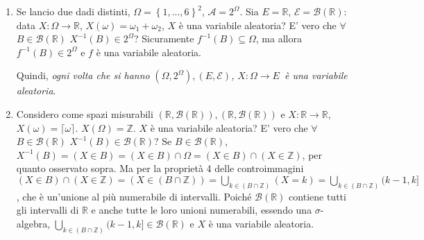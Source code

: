 \documentclass{article}
\begin{document}
\begin{enumerate}
\item Se lancio due dadi distinti, $\Omega =\left\{ 1,...,6\right\} ^{2}$, $%
\mathcal{A}=2^{\Omega }$. Sia $E=%
\mathbb{R}
$, $\mathcal{E=B}\left( 
\mathbb{R}
\right) $: data $X:\Omega \rightarrow 
\mathbb{R}
$, $X\left( \omega \right) =\omega _{1}+\omega _{2}$, $X$ \`{e} una
variabile aleatoria? E' vero che $\forall $ $B\in \mathcal{B}\left( 
\mathbb{R}
\right) $ $X^{-1}\left( B\right) \in 2^{\Omega }$? Sicuramente $f^{-1}\left(
B\right) \subseteq \Omega $, ma allora $f^{-1}\left( B\right) \in 2^{\Omega
} $ e $f$ \`{e} una variabile aleatoria.

Quindi, \textit{ogni volta che si hanno }$\left( \Omega ,2^{\Omega }\right)
,\left( E,\mathcal{E}\right) $\textit{, }$X:\Omega \rightarrow E$\textit{\ 
\`{e} una variabile aleatoria}.

\item Considero come spazi misurabili $\left( 
\mathbb{R}
,\mathcal{B}\left( 
\mathbb{R}
\right) \right) ,\left( 
\mathbb{R}
,\mathcal{B}\left( 
\mathbb{R}
\right) \right) $ e $X:%
\mathbb{R}
\rightarrow 
\mathbb{R}
$, $X\left( \omega \right) =\lceil \omega \rceil $. $X\left( \Omega \right) =%
\mathbb{Z}
$. $X$ \`{e} una variabile aleatoria? E' vero che $\forall $ $B\in \mathcal{B%
}\left( 
\mathbb{R}
\right) $ $X^{-1}\left( B\right) \in \mathcal{B}\left( 
\mathbb{R}
\right) $? Se $B\in \mathcal{B}\left( 
\mathbb{R}
\right) $, $X^{-1}\left( B\right) =\left( X\in B\right) =\left( X\in
B\right) \cap \Omega =\left( X\in B\right) \cap \left( X\in 
\mathbb{Z}
\right) $, per quanto osservato sopra. Ma per la propriet\`{a} 4 delle
controimmagini $\left( X\in B\right) \cap \left( X\in 
\mathbb{Z}
\right) =\left( X\in \left( B\cap \mathbb{Z}\right) \right) =\bigcup_{k\in
\left( B\cap \mathbb{Z}\right) }\left( X=k\right) =\bigcup_{k\in \left(
B\cap \mathbb{Z}\right) }(k-1,k]$, che \`{e} un'unione al pi\`{u} numerabile
di intervalli. Poich\'{e} $\mathcal{B}\left( 
\mathbb{R}
\right) $ contiene tutti gli intervalli di $%
\mathbb{R}
$ e anche tutte le loro unioni numerabili, essendo una $\sigma $-algebra, $%
\bigcup_{k\in \left( B\cap \mathbb{Z}\right) }(k-1,k]\in \mathcal{B}\left( 
\mathbb{R}
\right) $ e $X$ \`{e} una variabile aleatoria.


\end{enumerate}
\end{document}
